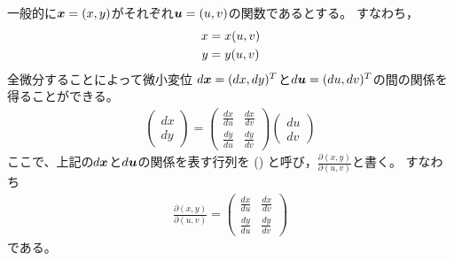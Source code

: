 \documentclass[twocolumn,11pt]{jarticle}
\begin{document}
一般的に$\boldsymbol{x}=(x,y)$がそれぞれ$\boldsymbol{u}=(u,v)$の関数であるとする。
すなわち，
\begin{align}
  x&=x(u,v)\notag\\
  y&=y(u,v)\notag
\end{align}
全微分することによって微小変位
$d\boldsymbol{x}=(dx,dy)^T$と$d\boldsymbol{u}=(du,dv)^T$の間の関係を
得ることができる。
\begin{align}
  \begin{pmatrix}
    dx \\ dy
  \end{pmatrix}
  =
  \begin{pmatrix}
  \displaystyle\frac{dx}{du} &\displaystyle\frac{dx}{dv}\\
  \displaystyle\frac{dy}{du} &\displaystyle\frac{dy}{dv}
  \end{pmatrix}
  \begin{pmatrix}
    du \\ dv
  \end{pmatrix}
\end{align}
ここで、上記の$d\boldsymbol{x}$と$d\boldsymbol{u}$の関係を表す行列を
()
と呼び，$\displaystyle\frac{\partial(x,y)}{\partial(u,v)}$と書く。
すなわち
\begin{align}
  \frac{\partial(x,y)}{\partial(u,v)}=
  \begin{pmatrix}
  \displaystyle\frac{dx}{du} &\displaystyle\frac{dx}{dv}\\
  \displaystyle\frac{dy}{du} &\displaystyle\frac{dy}{dv}
  \end{pmatrix}
\end{align}
である。
\end{document}
